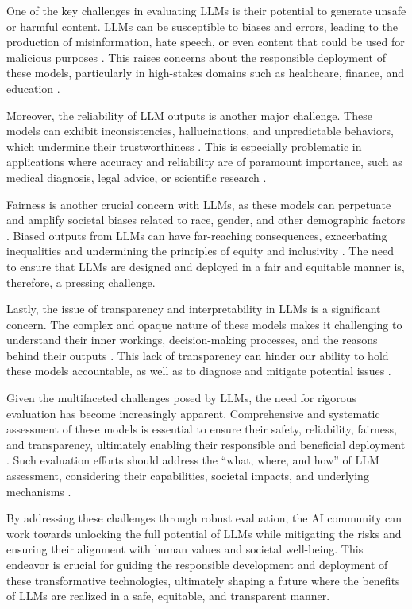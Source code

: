 \documentclass[11pt]{article}
\begin{document}
One of the key challenges in evaluating LLMs is their potential to generate unsafe or harmful content. LLMs can be susceptible to biases and errors, leading to the production of misinformation, hate speech, or even content that could be used for malicious purposes \cite{ref44,ref45}. This raises concerns about the responsible deployment of these models, particularly in high-stakes domains such as healthcare, finance, and education \cite{ref46,ref47}.

Moreover, the reliability of LLM outputs is another major challenge. These models can exhibit inconsistencies, hallucinations, and unpredictable behaviors, which undermine their trustworthiness \cite{ref48,ref34}. This is especially problematic in applications where accuracy and reliability are of paramount importance, such as medical diagnosis, legal advice, or scientific research \cite{ref49,ref50}.

Fairness is another crucial concern with LLMs, as these models can perpetuate and amplify societal biases related to race, gender, and other demographic factors \cite{ref51,ref52}. Biased outputs from LLMs can have far-reaching consequences, exacerbating inequalities and undermining the principles of equity and inclusivity \cite{ref53,ref54}. The need to ensure that LLMs are designed and deployed in a fair and equitable manner is, therefore, a pressing challenge.

Lastly, the issue of transparency and interpretability in LLMs is a significant concern. The complex and opaque nature of these models makes it challenging to understand their inner workings, decision-making processes, and the reasons behind their outputs \cite{ref55,ref44}. This lack of transparency can hinder our ability to hold these models accountable, as well as to diagnose and mitigate potential issues \cite{ref56,ref57}.

Given the multifaceted challenges posed by LLMs, the need for rigorous evaluation has become increasingly apparent. Comprehensive and systematic assessment of these models is essential to ensure their safety, reliability, fairness, and transparency, ultimately enabling their responsible and beneficial deployment \cite{ref57,ref58}. Such evaluation efforts should address the ``what, where, and how'' of LLM assessment, considering their capabilities, societal impacts, and underlying mechanisms \cite{ref59,ref60}.

By addressing these challenges through robust evaluation, the AI community can work towards unlocking the full potential of LLMs while mitigating the risks and ensuring their alignment with human values and societal well-being. This endeavor is crucial for guiding the responsible development and deployment of these transformative technologies, ultimately shaping a future where the benefits of LLMs are realized in a safe, equitable, and transparent manner.
\end{document}
